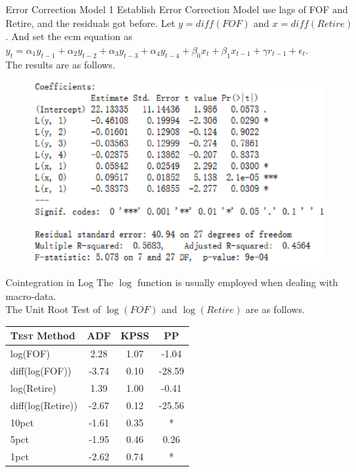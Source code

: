 \documentclass{beamer}
\begin{document}
\begin{frame}{Error Correction Model 1}
	Establish Error Correction Model use lags of FOF and Retire, and the residuals got before. Let $y = diff(FOF)$ and $x = diff(Retire)$ . And set the ecm equation as $y_t = \alpha_1 y_{t-1} + \alpha_2 y_{t-2} + \alpha_3 y_{t-3} + \alpha_4 y_{t-4} + \beta_0 x_t+\beta_1 x_{t-1} + \gamma r_{t-1} + \epsilon_t$.\\
	The results are as follows.
	\begin{center}
	\begin{figure}
		\includegraphics[scale = 0.5]{3-1-ecm.eps}
	\end{figure}
	\end{center}
\end{frame}


\begin{frame}{Cointegration in Log}
	The $\log$ function is usually employed when dealing with macro-data. \\
	The Unit Root Test of $\log(FOF)$ and $\log(Retire)$ are as follows.
	
	\begin{tabular}{|l| c| c| c|}
	\hline
	\textsc{Test} Method &  ADF   & KPSS &  PP     \\ \hline
	log(FOF)			 &  2.28  & 1.07 & -1.04   \\ \hline
	diff(log(FOF)) 		 & -3.74  & 0.10 & -28.59  \\ \hline
	log(Retire) 		 &  1.39  & 1.00 & -0.41   \\ \hline
	diff(log(Retire))	 & -2.67  & 0.12 & -25.56  \\ \hline
	10pct 				 & -1.61  & 0.35 &   * 	   \\ \hline
	5pct 				 & -1.95  & 0.46 & 0.26    \\ \hline
	1pct 				 & -2.62  & 0.74 &   *     \\ \hline

	\end{tabular}
\end{frame}
\end{document}
